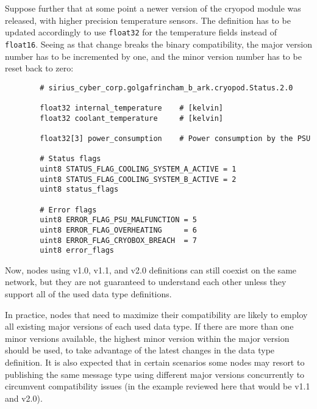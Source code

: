 \begin{remark}[breakable]
    Suppose further that at some point a newer version of the cryopod module was released,
    with higher precision temperature sensors.
    The definition has to be updated accordingly to use \verb|float32| for the temperature fields
    instead of \verb|float16|.
    Seeing as that change breaks the binary compatibility,
    the major version number has to be incremented by one, and the minor version number has to be reset back to zero:

    \begin{verbatim}
        # sirius_cyber_corp.golgafrincham_b_ark.cryopod.Status.2.0

        float32 internal_temperature    # [kelvin]
        float32 coolant_temperature     # [kelvin]

        float32[3] power_consumption    # Power consumption by the PSU

        # Status flags
        uint8 STATUS_FLAG_COOLING_SYSTEM_A_ACTIVE = 1
        uint8 STATUS_FLAG_COOLING_SYSTEM_B_ACTIVE = 2
        uint8 status_flags

        # Error flags
        uint8 ERROR_FLAG_PSU_MALFUNCTION = 5
        uint8 ERROR_FLAG_OVERHEATING     = 6
        uint8 ERROR_FLAG_CRYOBOX_BREACH  = 7
        uint8 error_flags
    \end{verbatim}

    Now, nodes using v1.0, v1.1, and v2.0 definitions can still coexist on the same network,
    but they are not guaranteed to understand each other unless they support all of the used data type definitions.

    In practice, nodes that need to maximize their compatibility are likely to employ all existing major versions of
    each used data type.
    If there are more than one minor versions available, the highest minor version within the major version should
    be used, to take advantage of the latest changes in the data type definition.
    It is also expected that in certain scenarios some nodes may resort to publishing the same message type
    using different major versions concurrently to circumvent compatibility issues (in the
    example reviewed here that would be v1.1 and v2.0).
\end{remark}
